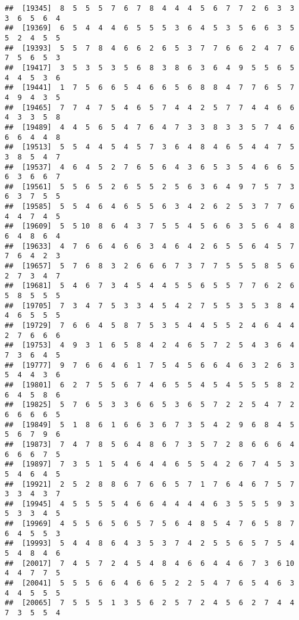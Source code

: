 \documentclass[
]{book}
\begin{document}
\begin{verbatim}
##  [19345]  8  5  5  5  7  6  7  8  4  4  4  5  6  7  7  2  6  3  3  3  6  5  6  4
##  [19369]  6  5  4  4  4  6  5  5  5  3  6  4  5  3  5  6  6  3  5  5  2  4  5  5
##  [19393]  5  5  7  8  4  6  6  2  6  5  3  7  7  6  6  2  4  7  6  7  5  6  5  3
##  [19417]  3  5  3  5  3  5  6  8  3  8  6  3  6  4  9  5  5  6  5  4  4  5  3  6
##  [19441]  1  7  5  6  6  5  4  6  6  5  6  8  8  4  7  7  6  5  7  4  9  4  3  5
##  [19465]  7  7  4  7  5  4  6  5  7  4  4  2  5  7  7  4  4  6  6  4  3  3  5  8
##  [19489]  4  4  5  6  5  4  7  6  4  7  3  3  8  3  3  5  7  4  6  6  6  4  4  8
##  [19513]  5  5  4  4  5  4  5  7  3  6  4  8  4  6  5  4  4  7  5  3  8  5  4  7
##  [19537]  4  6  4  5  2  7  6  5  6  4  3  6  5  3  5  4  6  6  5  6  3  6  6  7
##  [19561]  5  5  6  5  2  6  5  5  2  5  6  3  6  4  9  7  5  7  3  6  3  7  5  5
##  [19585]  5  5  4  6  4  6  5  5  6  3  4  2  6  2  5  3  7  7  6  4  4  7  4  5
##  [19609]  5  5 10  8  6  4  3  7  5  5  4  5  6  6  3  5  6  4  8  6  4  8  6  4
##  [19633]  4  7  6  6  4  6  6  3  4  6  4  2  6  5  5  6  4  5  7  7  6  4  2  3
##  [19657]  5  7  6  8  3  2  6  6  6  7  3  7  7  5  5  5  8  5  6  2  7  3  4  7
##  [19681]  5  4  6  7  3  4  5  4  4  5  5  6  5  5  7  7  6  2  6  5  8  5  5  5
##  [19705]  7  3  4  7  5  3  3  4  5  4  2  7  5  5  3  5  3  8  4  4  6  5  5  5
##  [19729]  7  6  6  4  5  8  7  5  3  5  4  4  5  5  2  4  6  4  4  2  7  6  6  6
##  [19753]  4  9  3  1  6  5  8  4  2  4  6  5  7  2  5  4  3  6  4  7  3  6  4  5
##  [19777]  9  7  6  6  4  6  1  7  5  4  5  6  6  4  6  3  2  6  3  5  4  4  3  6
##  [19801]  6  2  7  5  5  6  7  4  6  5  5  4  5  4  5  5  5  8  2  6  4  5  8  6
##  [19825]  5  7  6  5  3  3  6  6  5  3  6  5  7  2  2  5  4  7  2  6  6  6  6  5
##  [19849]  5  1  8  6  1  6  6  3  6  7  3  5  4  2  9  6  8  4  5  5  6  7  9  6
##  [19873]  7  4  7  8  5  6  4  8  6  7  3  5  7  2  8  6  6  6  4  6  6  6  7  5
##  [19897]  7  3  5  1  5  4  6  4  4  6  5  5  4  2  6  7  4  5  3  5  4  6  4  5
##  [19921]  2  5  2  8  8  6  7  6  6  5  7  1  7  6  4  6  7  5  7  3  3  4  3  7
##  [19945]  4  5  5  5  5  4  6  6  4  4  4  4  6  3  5  5  5  9  3  5  3  3  4  5
##  [19969]  4  5  5  6  5  6  5  7  5  6  4  8  5  4  7  6  5  8  7  6  4  5  5  3
##  [19993]  5  4  4  8  6  4  3  5  3  7  4  2  5  5  6  5  7  5  4  5  4  8  4  6
##  [20017]  7  4  5  7  2  4  5  4  8  4  6  6  4  4  6  7  3  6 10  4  4  7  7  5
##  [20041]  5  5  5  6  6  4  6  6  5  2  2  5  4  7  6  5  4  6  3  4  4  5  5  5
##  [20065]  7  5  5  5  1  3  5  6  2  5  7  2  4  5  6  2  7  4  4  7  3  5  5  4

\end{verbatim}
\end{document}
